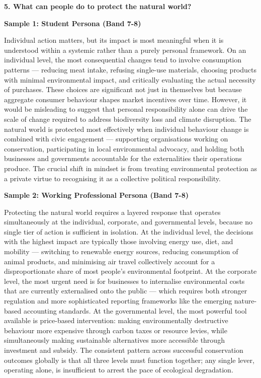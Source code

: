 \separator

\begin{ieltsquestion}
\textbf{5. What can people do to protect the natural world?}
\end{ieltsquestion}
\textbf{Sample 1: Student Persona (Band 7-8)}

Individual action matters, but its impact is most meaningful when it is understood within a systemic rather than a purely personal framework. On an individual level, the most consequential changes tend to involve consumption patterns — reducing meat intake, refusing single-use materials, choosing products with minimal environmental impact, and critically evaluating the actual necessity of purchases. These choices are significant not just in themselves but because aggregate consumer behaviour shapes market incentives over time. However, it would be misleading to suggest that personal responsibility alone can drive the scale of change required to address biodiversity loss and climate disruption. The natural world is protected most effectively when individual behaviour change is combined with civic engagement — supporting organisations working on conservation, participating in local environmental advocacy, and holding both businesses and governments accountable for the externalities their operations produce. The crucial shift in mindset is from treating environmental protection as a private virtue to recognising it as a collective political responsibility.

\textbf{Sample 2: Working Professional Persona (Band 7-8)}

Protecting the natural world requires a layered response that operates simultaneously at the individual, corporate, and governmental levels, because no single tier of action is sufficient in isolation. At the individual level, the decisions with the highest impact are typically those involving energy use, diet, and mobility — switching to renewable energy sources, reducing consumption of animal products, and minimising air travel collectively account for a disproportionate share of most people's environmental footprint. At the corporate level, the most urgent need is for businesses to internalise environmental costs that are currently externalised onto the public — which requires both stronger regulation and more sophisticated reporting frameworks like the emerging nature-based accounting standards. At the governmental level, the most powerful tool available is price-based intervention: making environmentally destructive behaviour more expensive through carbon taxes or resource levies, while simultaneously making sustainable alternatives more accessible through investment and subsidy. The consistent pattern across successful conservation outcomes globally is that all three levels must function together; any single lever, operating alone, is insufficient to arrest the pace of ecological degradation.


